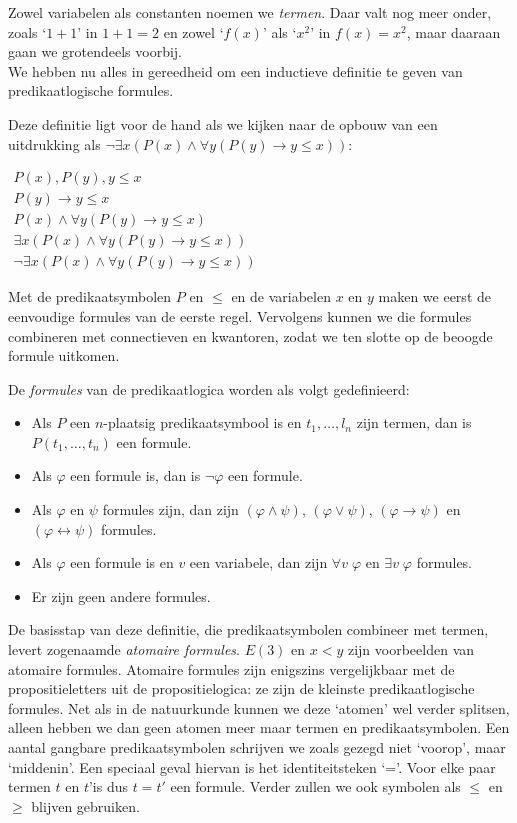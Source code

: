 Zowel variabelen als constanten noemen we \textit{termen}. Daar valt nog meer onder, zoals `$1 + 1$' in $1+1=2$ en zowel `$f(x)$' als `$x^2$' in $f(x)=x^2$, maar daaraan gaan we grotendeels voorbij.\\
We hebben nu alles in gereedheid om een inductieve definitie te geven van predikaatlogische formules.

\begin{example}
Deze definitie ligt voor de hand als we kijken naar de opbouw van een uitdrukking als $\neg\exists x(P(x)\wedge\forall y(P(y)\rightarrow y\leq x))$:

$\begin{array}{l}
P(x), P(y), y\leq x\\
P(y)\rightarrow y\leq x\\
P(x)\wedge\forall y(P(y)\rightarrow y\leq x)\\
\exists x(P(x)\wedge\forall y(P(y)\rightarrow y\leq x))\\
\neg\exists x(P(x)\wedge\forall y(P(y)\rightarrow y\leq x))
\end{array}$

\noindent
Met de predikaatsymbolen $P$ en $\leq$ en de variabelen $x$ en $y$ maken we eerst de eenvoudige formules van de eerste regel. Vervolgens kunnen we die formules combineren met connectieven en kwantoren, zodat we ten slotte op de beoogde formule uitkomen.
\end{example}

\begin{definition}
De \textit{formules} van de predikaatlogica worden als volgt gedefinieerd:
\begin{itemize}
    \item Als $P$ een $n$-plaatsig predikaatsymbool is en $t_1,\ldots,l_n$ zijn termen, dan is $P(t_1,\ldots,t_n)$ een formule.
    \item Als $\varphi$ een formule is, dan is $\neg\varphi$ een formule.
    \item Als $\varphi$ en $\psi$ formules zijn, dan zijn $(\varphi\wedge\psi)$, $(\varphi\vee\psi)$, $(\varphi\rightarrow\psi)$ en $(\varphi\leftrightarrow\psi)$ formules.
    \item Als $\varphi$ een formule is en $v$ een variabele, dan zijn $\forall v\;\varphi$ en $\exists v\;\varphi$ formules.
    \item Er zijn geen andere formules.
\end{itemize}
\end{definition}
De basisstap van deze definitie, die predikaatsymbolen combineer met termen, levert zogenaamde \textit{atomaire formules}. $E(3)$ en $x<y$ zijn voorbeelden van atomaire formules. Atomaire formules zijn enigszins vergelijkbaar met de propositieletters uit de propositielogica: ze zijn de kleinste predikaatlogische formules. Net als in de natuurkunde kunnen we deze `atomen' wel verder splitsen, alleen hebben we dan geen atomen meer maar termen en predikaatsymbolen. Een aantal gangbare predikaatsymbolen schrijven we zoals gezegd niet `voorop', maar `middenin'. Een speciaal geval hiervan is het identiteitsteken `='. Voor elke paar termen $t$ en $t$'is dus $t=t'$ een formule. Verder zullen we ook symbolen als $\leq$ en $\geq$ blijven gebruiken.


